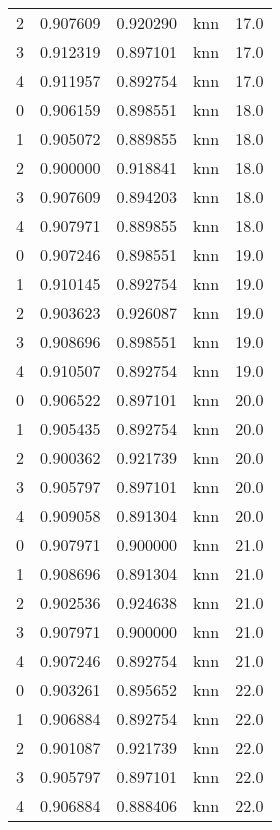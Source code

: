 \begin{tabular}{rrrlr}
     2 & 0.907609 & 0.920290 &      knn &       17.0 \\
     3 & 0.912319 & 0.897101 &      knn &       17.0 \\
     4 & 0.911957 & 0.892754 &      knn &       17.0 \\
     0 & 0.906159 & 0.898551 &      knn &       18.0 \\
     1 & 0.905072 & 0.889855 &      knn &       18.0 \\
     2 & 0.900000 & 0.918841 &      knn &       18.0 \\
     3 & 0.907609 & 0.894203 &      knn &       18.0 \\
     4 & 0.907971 & 0.889855 &      knn &       18.0 \\
     0 & 0.907246 & 0.898551 &      knn &       19.0 \\
     1 & 0.910145 & 0.892754 &      knn &       19.0 \\
     2 & 0.903623 & 0.926087 &      knn &       19.0 \\
     3 & 0.908696 & 0.898551 &      knn &       19.0 \\
     4 & 0.910507 & 0.892754 &      knn &       19.0 \\
     0 & 0.906522 & 0.897101 &      knn &       20.0 \\
     1 & 0.905435 & 0.892754 &      knn &       20.0 \\
     2 & 0.900362 & 0.921739 &      knn &       20.0 \\
     3 & 0.905797 & 0.897101 &      knn &       20.0 \\
     4 & 0.909058 & 0.891304 &      knn &       20.0 \\
     0 & 0.907971 & 0.900000 &      knn &       21.0 \\
     1 & 0.908696 & 0.891304 &      knn &       21.0 \\
     2 & 0.902536 & 0.924638 &      knn &       21.0 \\
     3 & 0.907971 & 0.900000 &      knn &       21.0 \\
     4 & 0.907246 & 0.892754 &      knn &       21.0 \\
     0 & 0.903261 & 0.895652 &      knn &       22.0 \\
     1 & 0.906884 & 0.892754 &      knn &       22.0 \\
     2 & 0.901087 & 0.921739 &      knn &       22.0 \\
     3 & 0.905797 & 0.897101 &      knn &       22.0 \\
     4 & 0.906884 & 0.888406 &      knn &       22.0 \\

\end{tabular}
